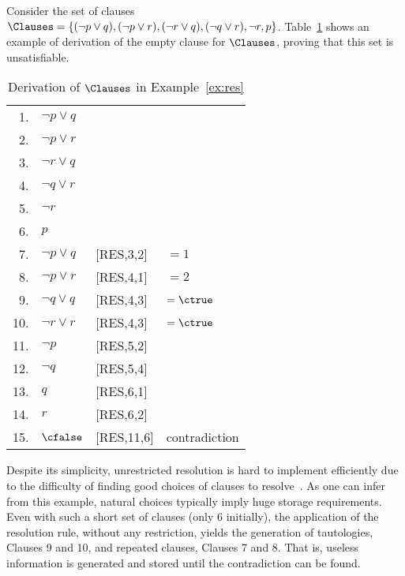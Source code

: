 \begin{example}%
\label{ex:res}
    Consider the set of clauses $\Clauses = \{(\neg p \lor q), (\neg p \lor r),
    (\neg r \lor q), (\neg q \lor r), \neg r, p\}$. Table~\ref{tab:res} shows an
    example of derivation of the empty clause for $\Clauses$, proving that this
    set is unsatisfiable. 

    \begin{table}%
    \caption{Derivation of $\Clauses$ in Example~\ref{ex:res}}
        \centering
        \begin{tabular}{rlll}
            1. & $\neg p \lor q$ & & \\
            2. & $\neg p \lor r$ & & \\
            3. & $\neg r \lor q$ & & \\
            4. & $\neg q \lor r$ & & \\
            5. & $\neg r$ & & \\
            6. & $p$ & & \\
            7. & $\neg p \lor q$ & [RES,3,2] & $= 1$\\
            8. & $\neg p \lor r$ & [RES,4,1] & $= 2$\\
            9. & $\neg q \lor q$ & [RES,4,3] & $= \ctrue$\\
            10.&  $\neg r \lor r$ & [RES,4,3] & $= \ctrue$\\
            11.&  $\neg p$ & [RES,5,2] & \\
            12.&  $\neg q$ & [RES,5,4] & \\
            13.&  $q$ & [RES,6,1] & \\
            14.&  $r$ & [RES,6,2] & \\
            15.&  $\cfalse$ & [RES,11,6] & contradiction\\
        \end{tabular}%
    \label{tab:res}
    \end{table}

    Despite its simplicity, unrestricted resolution is hard to implement
    efficiently due to the difficulty of finding good choices of clauses to
    resolve~\cite{satchapter}. As one can infer from this example, natural
    choices typically imply huge storage requirements. Even with such a short
    set of clauses (only 6 initially), the application of the resolution rule,
    without any restriction, yields the generation of tautologies, Clauses 9 and
    10, and repeated clauses, Clauses 7 and 8. That is, useless information is
    generated and stored until the contradiction can be found. 
\end{example}

